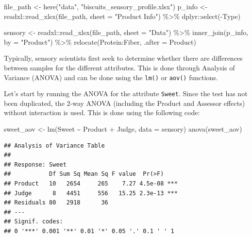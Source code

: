 \documentclass[
]{krantz}
\makeatletter
\newenvironment{Shaded}{\begin{snugshade}}{\end{snugshade}}
\newcommand{\AttributeTok}[1]{\textcolor[rgb]{0.61,0.61,0.61}{#1}}
\newcommand{\FunctionTok}[1]{\textcolor[rgb]{0,0,0}{#1}}
\newcommand{\NormalTok}[1]{#1}
\newcommand{\OtherTok}[1]{\textcolor[rgb]{0.37,0.37,0.37}{#1}}
\newcommand{\SpecialCharTok}[1]{\textcolor[rgb]{0,0,0}{#1}}
\newcommand{\StringTok}[1]{\textcolor[rgb]{0.5,0.5,0.5}{#1}}
\newenvironment{kframe}{%
\medskip{}
\setlength{\fboxsep}{.8em}
 \def\at@end@of@kframe{}%
 \ifinner\ifhmode%
  \def\at@end@of@kframe{\end{minipage}}%
  \begin{minipage}{\columnwidth}%
 \fi\fi%
 \def\FrameCommand##1{\hskip\@totalleftmargin \hskip-\fboxsep
 \colorbox{shadecolor}{##1}\hskip-\fboxsep
     \hskip-\linewidth \hskip-\@totalleftmargin \hskip\columnwidth}%
 \MakeFramed {\advance\hsize-\width
   \@totalleftmargin\z@ \linewidth\hsize
   \@setminipage}}%
 {\par\unskip\endMakeFramed%
 \at@end@of@kframe}
\renewenvironment{Shaded}{\begin{kframe}}{\end{kframe}}
\makeatother
\begin{document}
\begin{Shaded}
\begin{Highlighting}[]
\NormalTok{file\_path }\OtherTok{\textless{}{-}} \FunctionTok{here}\NormalTok{(}\StringTok{"data"}\NormalTok{, }\StringTok{"biscuits\_sensory\_profile.xlsx"}\NormalTok{)}
\NormalTok{p\_info }\OtherTok{\textless{}{-}}\NormalTok{ readxl}\SpecialCharTok{::}\FunctionTok{read\_xlsx}\NormalTok{(file\_path, }\AttributeTok{sheet =} \StringTok{"Product Info"}\NormalTok{) }\SpecialCharTok{\%\textgreater{}\%}
\NormalTok{  dplyr}\SpecialCharTok{::}\FunctionTok{select}\NormalTok{(}\SpecialCharTok{{-}}\NormalTok{Type)}

\NormalTok{sensory }\OtherTok{\textless{}{-}}\NormalTok{ readxl}\SpecialCharTok{::}\FunctionTok{read\_xlsx}\NormalTok{(file\_path, }\AttributeTok{sheet =} \StringTok{"Data"}\NormalTok{) }\SpecialCharTok{\%\textgreater{}\%}
  \FunctionTok{inner\_join}\NormalTok{(p\_info, }\AttributeTok{by =} \StringTok{"Product"}\NormalTok{) }\SpecialCharTok{\%\textgreater{}\%}
  \FunctionTok{relocate}\NormalTok{(Protein}\SpecialCharTok{:}\NormalTok{Fiber, }\AttributeTok{.after =}\NormalTok{ Product)}
\end{Highlighting}
\end{Shaded}

Typically, sensory scientists first seek to determine whether there are differences between samples for the different attributes. This is done through Analysis of Variance (ANOVA) and can be done using the \texttt{lm()} or \texttt{aov()} functions.

Let's start by running the ANOVA for the attribute \texttt{Sweet}. Since the test has not been duplicated, the 2-way ANOVA (including the Product and Assessor effects) without interaction is used. This is done using the following code:

\begin{Shaded}
\begin{Highlighting}[]
\NormalTok{sweet\_aov }\OtherTok{\textless{}{-}} \FunctionTok{lm}\NormalTok{(Sweet }\SpecialCharTok{\textasciitilde{}}\NormalTok{ Product }\SpecialCharTok{+}\NormalTok{ Judge, }\AttributeTok{data =}\NormalTok{ sensory)}
\FunctionTok{anova}\NormalTok{(sweet\_aov)}
\end{Highlighting}
\end{Shaded}

\begin{verbatim}
## Analysis of Variance Table
## 
## Response: Sweet
##           Df Sum Sq Mean Sq F value  Pr(>F)    
## Product   10   2654     265    7.27 4.5e-08 ***
## Judge      8   4451     556   15.25 2.3e-13 ***
## Residuals 80   2918      36                    
## ---
## Signif. codes:  
## 0 '***' 0.001 '**' 0.01 '*' 0.05 '.' 0.1 ' ' 1
\end{verbatim}
\end{document}

